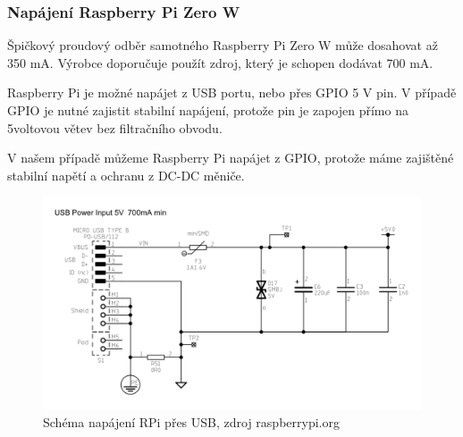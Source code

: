 \subsubsection{Napájení Raspberry Pi Zero W}
Špičkový proudový odběr samotného Raspberry Pi Zero W může dosahovat až 350 mA. Výrobce doporučuje použít zdroj, který je schopen dodávat 700 mA. 

Raspberry Pi je možné napájet z USB portu, nebo přes GPIO 5 V pin. V případě GPIO je nutné zajistit stabilní napájení, protože pin je zapojen přímo na 5voltovou větev bez filtračního obvodu.

V našem případě můžeme Raspberry Pi napájet z GPIO, protože máme zajištěné stabilní napětí a ochranu z DC-DC měniče.

\begin{figure}[h]
  \begin{center}
    \includegraphics[scale=0.5]{obrazky/rpi_power.png}
  \end{center}
  \caption{Schéma napájení RPi přes USB, zdroj raspberrypi.org}
\end{figure}

